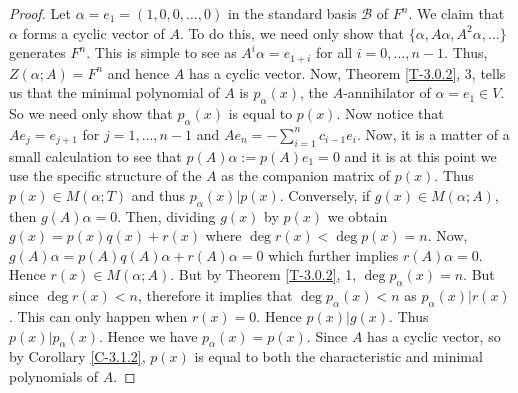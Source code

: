 \documentclass[letterpaper,11pt,twoside]{article}
\theoremstyle{definition}
\theoremstyle{definition}
\theoremstyle{definition}
\theoremstyle{definition}
\theoremstyle{definition}
\theoremstyle{definition}
\theoremstyle{remark}
\theoremstyle{definition}
\newcommand{\gen}[1]{\langle #1\rangle}
\newcommand{\Comp}[1]{{\fontfamily{lmss}\selectfont 
            \text{Comp}\left(#1\right)
}}
\begin{document}
    \begin{proof}
Let $ \alpha = e_1= (1,0,0,\dots,0) $ in the standard basis $ \mathcal{B} $ of $ F^n $. We claim that $ \alpha $ forms a cyclic vector of $ A $. To do this, we need only show that $ \{\alpha,A\alpha, A^{2}\alpha, \dots\} $ generates $ F^{n} $. This is simple to see as $ A^{i}\alpha = e_{1+i} $ for all $ i=0,\dots, n-1 $. Thus, $ Z(\alpha;A) = F^{n} $ and hence $ A $ has a cyclic vector.
Now, Theorem \ref{T-3.0.2}, 3, tells us that the minimal polynomial of $ A $ is $ p_\alpha(x) $, the $ A $-annihilator of $ \alpha = e_1 \in V$. So we need only show that $ p_\alpha(x) $ is equal to $ p(x) $. Now notice that $ Ae_j = e_{j+1} $ for $ j=1,\dots,n-1 $ and $ Ae_n = -\sum_{i=1}^{n} c_{i-1} e_i $. Now, it is a matter of a small calculation to see that $ p(A)\alpha := p(A) e_1 = 0$ and it is at this point we use the specific structure of the $ A $ as the companion matrix of $ p(x) $. Thus $ p(x)\in M(\alpha;T) $ and thus $ p_\alpha(x)| p(x) $. Conversely, if $ g(x) \in M(\alpha;A) $, then $ g(A)\alpha = 0 $. Then, dividing $ g(x) $ by $ p(x) $ we obtain $ g(x) = p(x)q(x) + r(x) $ where $ \deg r(x) < \deg p(x) = n $. Now, $ g(A)\alpha = p(A)q(A)\alpha + r(A)\alpha  = 0 $ which further implies $ r(A)\alpha = 0 $. Hence $ r(x) \in M(\alpha;A) $. But by Theorem \ref{T-3.0.2}, 1, $ \deg p_\alpha(x) = n $. But since $ \deg r(x) < n $, therefore it implies that $ \deg p_\alpha(x) < n $ as $ p_\alpha(x ) | r(x) $. This can only happen when $ r(x) = 0 $. Hence $ p(x)|g(x) $. Thus $ p(x)|p_\alpha(x) $. Hence we have $ p_\alpha(x) = p(x) $. Since $ A $ has a cyclic vector, so by Corollary \ref{C-3.1.2}, $ p(x) $ is equal to both the characteristic and minimal polynomials of $ A $.

\end{proof}
\end{document}
